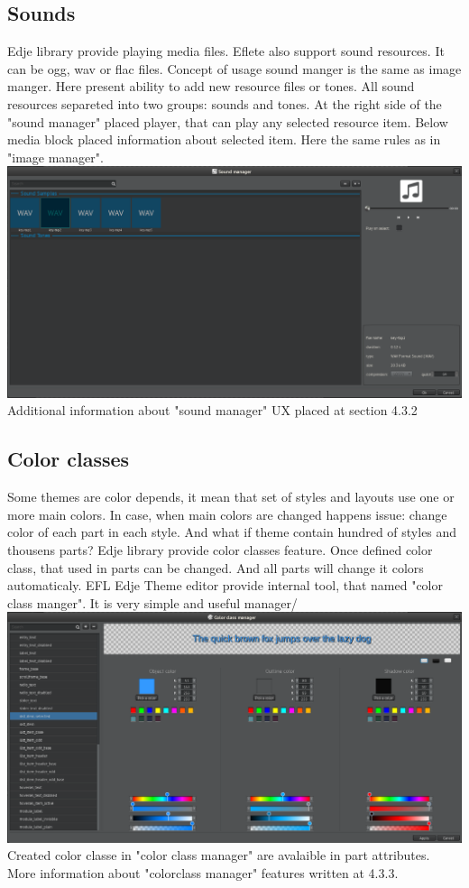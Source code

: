 \documentclass[titlepage,oneside,11pt]{book}
\begin{document}
\subsection{Sounds}
Edje library provide playing media files. Eflete also support sound resources. It can be ogg, wav or flac files. Concept of usage sound manger is the same as image manger. Here present ability to add new resource files or tones. All sound resources separeted into two groups: sounds and tones. At the right side of the "{}sound manager"{} placed player, that can play any selected resource item. Below media block placed information about selected item. Here the same rules as in "{}image manager"{}.\newline
\includegraphics[scale=0.3]{images/sound_manager_main.png}\newline
Additional information about "{}sound manager"{} UX placed at section 4.3.2
\subsection{Color classes}
Some themes are color depends, it mean that set of styles and layouts use one or more main colors. In case, when main colors are changed happens issue: change color of each part in each style. And what if theme contain hundred of styles and thousens parts? Edje library provide color classes feature. Once defined color class, that used in parts can be changed. And all parts will change it colors automaticaly. EFL Edje Theme editor provide internal tool, that named "{}color class manger"{}. It is very simple and useful manager/\newline
\includegraphics[scale=0.3]{images/colorclass_manager_main.png}\newline
Created color classe in "{}color class manager"{} are avalaible in part attributes.
More information about "{}colorclass manager"{} features written at 4.3.3.
\end{document}
